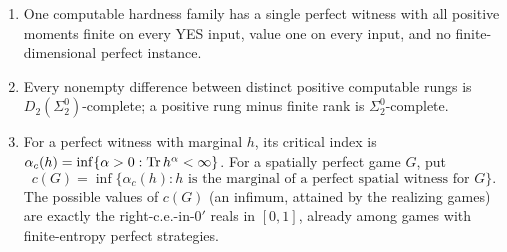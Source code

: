 \begin{theorem}\label{thm:momentrefine}
\leavevmode
\begin{enumerate}[label=(\alph*)]
\item One computable hardness family has a single perfect witness with
all positive moments finite on every YES input, value one on every
input, and no finite-dimensional perfect instance.
\item Every nonempty difference between distinct positive computable
rungs is $D_2(\Sigma^0_2)$-complete; a positive rung minus finite rank
is $\Sigma^0_2$-complete.
\item For a perfect witness with marginal $h$, its critical index is
$\alpha_c(h)=\inf\{\alpha>0:\operatorname{Tr} h^\alpha<\infty\}$. For a spatially perfect game $G$, put
\[
c(G)=\inf\{\alpha_c(h):h\text{ is the marginal of a perfect spatial witness for }G\}.
\]
The possible values of $c(G)$ (an infimum, attained by the realizing
games) are exactly the right-c.e.-in-$0'$ reals in $[0,1]$, already
among games with finite-entropy perfect strategies.
\end{enumerate}
\end{theorem}

